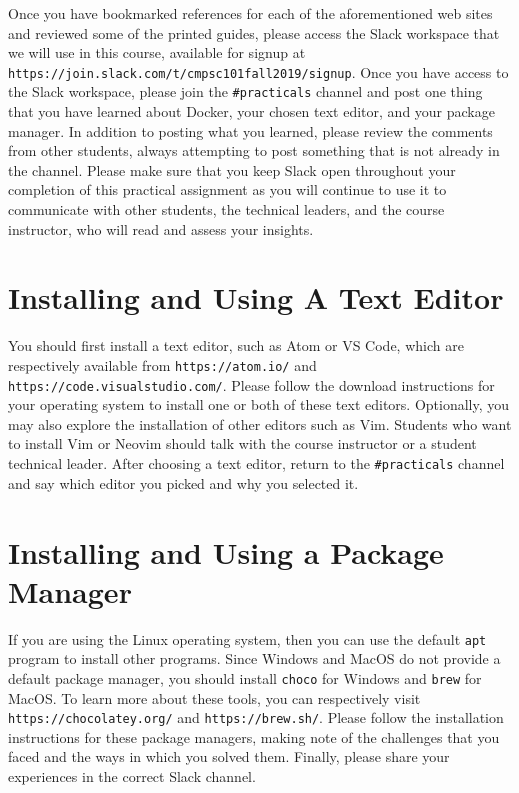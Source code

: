\documentclass[11pt]{article}
\newcommand{\program}[1]{\lstinline{#1}}
\newcommand{\url}[1]{\lstinline{#1}}
\begin{document}
Once you have bookmarked references for each of the aforementioned web sites and
reviewed some of the printed guides, please access the Slack workspace that we
will use in this course, available for signup at
\url{https://join.slack.com/t/cmpsc101fall2019/signup}. Once you have access to
the Slack workspace, please join the \url{#practicals} channel and post one
thing that you have learned about Docker, your chosen text editor, and your
package manager. In addition to posting what you learned, please review the
comments from other students, always attempting to post something that is not
already in the channel. Please make sure that you keep Slack open throughout
your completion of this practical assignment as you will continue to use it to
communicate with other students, the technical leaders, and the course
instructor, who will read and assess your insights.

\section*{Installing and Using A Text Editor}

You should first install a text editor, such as Atom or VS Code, which are
respectively available from \url{https://atom.io/} and
\url{https://code.visualstudio.com/}. Please follow the download instructions
for your operating system to install one or both of these text editors.
Optionally, you may also explore the installation of other editors such as Vim.
Students who want to install Vim or Neovim should talk with the course
instructor or a student technical leader. After choosing a text editor, return
to the \url{#practicals} channel and say which editor you picked and why you
selected it.

\section*{Installing and Using a Package Manager}

If you are using the Linux operating system, then you can use the default
\program{apt} program to install other programs. Since Windows and MacOS do not
provide a default package manager, you should install \program{choco} for
Windows and \program{brew} for MacOS. To learn more about these tools, you can
respectively visit \url{https://chocolatey.org/} and \url{https://brew.sh/}.
Please follow the installation instructions for these package managers, making
note of the challenges that you faced and the ways in which you solved them.
Finally, please share your experiences in the correct Slack channel.
\end{document}
